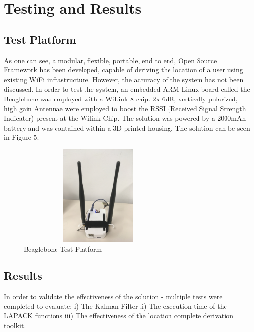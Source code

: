 \documentclass[conference]{IEEEtran}
\begin{document}
\section{Testing and Results}
\subsection{Test Platform}
As one can see, a modular, flexible, portable, end to end, Open Source Framework has been developed, capable of deriving the location of a user using existing WiFi infrastructure. However, the accuracy of the system has not been discussed. In order to test the system, an embedded ARM Linux board called the Beaglebone was employed with a WiLink 8 chip. 2x 6dB, vertically polarized, high gain Antennae were employed to boost the RSSI (Received Signal Strength Indicator) present at the Wilink Chip. The solution was powered by a 2000mAh battery and was contained within a 3D printed housing. The solution can be seen in Figure 5.
\begin{figure}[H]
    \includegraphics[width=8cm,height=5cm]{IMG_0796.JPG}
    \caption{Beaglebone Test Platform}
    \end{figure}

\subsection{Results}
In order to validate the effectiveness of the solution - multiple tests were completed to evaluate:\newline
i) The Kalman Filter \newline
ii) The execution time of the LAPACK functions\newline
iii) The effectiveness of the location complete derivation toolkit.
\end{document}
